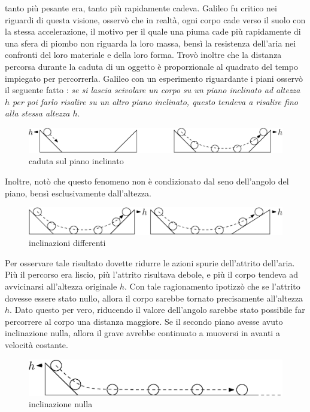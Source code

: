 \documentclass[10pt, letterpaper]{report}
\begin{document}
tanto più pesante era, tanto più rapidamente cadeva. \acc 
Galileo fu critico nei riguardi di questa visione, osservò che in realtà, ogni corpo 
cade verso il suolo con la stessa accelerazione, il motivo per il quale una piuma cade 
più rapidamente di una sfera di piombo non riguarda la loro massa, bensì la resistenza dell'aria 
nei confronti del loro materiale e della loro forma. Trovò inoltre che la distanza percorsa 
durante la caduta di un oggetto è proporzionale al quadrato del tempo impiegato per percorrerla.\acc 
Galileo con un esperimento riguardante i piani osservò il seguente fatto : 
    \textit{se si lascia scivolare un corpo su un piano inclinato ad altezza $h$ per poi 
    farlo risalire su un altro piano inclinato, questo tendeva a risalire fino alla 
    stessa altezza $h$}.
    \begin{figure}[h!]
        \centering
        \includegraphics[width=500pt]{images/cadutaGraveBW.eps}
        \caption{ caduta sul piano inclinato}
        \label{fig:caduta}
    \end{figure}\acc
Inoltre, notò che questo fenomeno non è condizionato dal seno dell'angolo del piano, bensì 
esclusivamente dall'altezza.
\begin{figure}[h!]
    \centering
    \includegraphics[width=500pt]{images/cadutaGrave2BW.eps}
    \caption{ inclinazioni differenti}
    \label{fig:caduta2}
\end{figure}\acc
Per osservare tale risultato dovette ridurre le azioni spurie dell'attrito dell'aria. Più 
il percorso era liscio, più l'attrito risultava debole, e più il corpo tendeva ad 
avvicinarsi all'altezza originale $h$. Con tale ragionamento ipotizzò che se l'attrito dovesse 
essere stato nullo, allora il corpo sarebbe tornato precisamente all'altezza $h$.\acc 
Dato questo per vero, riducendo il valore dell'angolo sarebbe stato possibile far percorrere 
al corpo una distanza maggiore. Se il secondo piano avesse avuto inclinazione nulla, allora 
il grave avrebbe continuato a muoversi in avanti a velocità costante.\begin{figure}[h!]
    \centering
    \includegraphics[width=330pt]{images/cadutaGrave3BW.eps}
    \caption{ inclinazione nulla}
    \label{fig:caduta3}
\end{figure}\acc
\end{document}
